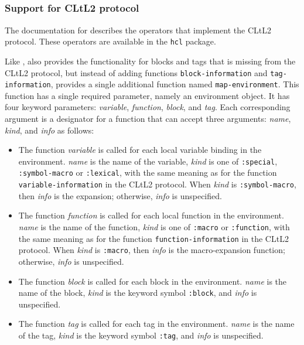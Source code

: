 \subsection{\lispworks{}}
\label{sec-previous-lispworks}

\subsubsection{Support for CLtL2 protocol}

The documentation for \lispworks{} \commonlisp{} describes the
operators that implement the CLtL2 protocol.  These operators are
available in the \texttt{hcl} package.

Like \allegro{}, \lispworks{} also provides the functionality for
blocks and tags that is missing from the CLtL2 protocol, but instead
of adding functions \texttt{block-information} and
\texttt{tag-information}, \lispworks{} provides a single additional
function named \texttt{map-environment}.  This function has a single
required parameter, namely an environment object.  It has four
keyword parameters: \textit{variable}, \textit{function},
\textit{block}, and \textit{tag}.  Each corresponding argument is a
designator for a function that can accept three arguments:
\textit{name}, \textit{kind}, and \textit{info} as follows:

\begin{itemize}
\item The function \textit{variable} is called for each local variable
  binding in the environment.  \textit{name} is the name of the
  variable, \textit{kind} is one of \texttt{:special},
  \texttt{:symbol-macro} or \texttt{:lexical}, with the same meaning
  as for the function \texttt{variable-information} in the CLtL2
  protocol.  When \textit{kind} is \texttt{:symbol-macro}, then
  \textit{info} is the expansion; otherwise, \textit{info} is
  unspecified.
\item The function \textit{function} is called for each local function
  in the environment. \textit{name} is the name of the function,
  \textit{kind} is one of \texttt{:macro} or \texttt{:function}, with
  the same meaning as for the function \texttt{function-information}
  in the CLtL2 protocol.  When \textit{kind} is \texttt{:macro}, then
  \textit{info} is the macro-expansion function; otherwise,
  \textit{info} is unspecified.
\item The function \textit{block} is called for each block in the
  environment.  \textit{name} is the name of the block, \textit{kind}
  is the keyword symbol \texttt{:block}, and \textit{info} is
  unspecified.
\item The function \textit{tag} is called for each tag in the
  environment.  \textit{name} is the name of the tag, \textit{kind}
  is the keyword symbol \texttt{:tag}, and \textit{info} is
  unspecified.
\end{itemize}

